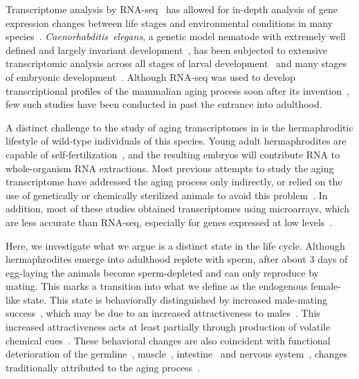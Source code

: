 Transcriptome analysis by RNA-seq~\citep{Mortazavi2008} has allowed for in-depth
analysis of gene expression changes between life stages and environmental
conditions in many species~\citep{Gerstein2014,Blaxter2012}.
\emph{Caenorhabditis~elegans}, a genetic model nematode with extremely
well defined and largely invariant development~\citep{Sulston1977,Sulston1983},
has been subjected to extensive transcriptomic analysis across all stages of
larval development~\citep{Hillier2009,Boeck2016,Murray2012}
and many stages of embryonic development~\citep{Boeck2016}. Although RNA-seq was
used to develop transcriptional profiles of the mammalian aging process soon
after its invention~\citep{Magalhaes2010}, few such studies have been conducted
in \cel{} past the entrance into adulthood.

A distinct challenge to the study of aging transcriptomes in \cel{} is the
hermaphroditic lifestyle of wild-type individuals of this species. Young adult
hermaphrodites are capable of self-fertilization~\citep{Brenner1974,Corsi2015},
and the resulting embryos will contribute RNA to whole-organism RNA extractions.
Most previous attempts to study the \cel{} aging transcriptome have addressed
the aging process only indirectly, or relied on the use of genetically or
chemically sterilized animals to avoid this problem~\citep{Murphy2003,
Halaschek-wiener2005,Lund2002,McCormick2012,Eckley2013,Boeck2016,Rangaraju2015}.
In addition, most of these studies obtained transcriptomes using microarrays,
which are less accurate than RNA-seq, especially for genes expressed at low
levels~\citep{Wang2014}.

Here, we investigate what we argue is a distinct state in the \cel{} life cycle.
Although \cel{} hermaphrodites emerge into adulthood replete with sperm,
after about 3 days of egg-laying the animals become sperm-depleted and can only
reproduce by mating. This marks a transition into what we define as the
endogenous female-like state. This state is behaviorally distinguished by
increased male-mating success~\citep{Garcia2007}, which may be due to an
increased attractiveness to males~\citep{Morsci2011}. This increased
attractiveness acts at least partially through production of volatile chemical
cues~\citep{Leighton2014}. These behavioral changes are also coincident with
functional deterioration of the germline~\citep{Andux2008},
muscle~\citep{Herndon2002}, intestine~\citep{McGee2011} and nervous
system~\citep{Liu2013}, changes traditionally attributed to the aging
process~\citep{Golden2007}.

